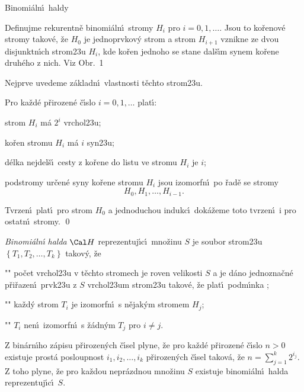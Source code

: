 \heading
Binomi\'aln\'\i\ haldy
\endheading 

\flushpar Definujme rekurentn\v e binomi\'aln\'\i\ stromy $H_i$ pro 
$i=0,1,\dots$.  Jsou to ko\v renov\'e stromy takov\'e, \v ze $H_0$ je 
jednoprvkov\'y strom a  strom $H_{i+1}$ vznikne ze dvou 
disjunktn\'\i ch strom\accent23u $H_i$, kde ko\v ren jednoho  
se stane dal\v s\'\i m synem ko\v rene druh\'eho z nich.  Viz 
Obr.~1 
\medskip

\midinsert
\centerline{}
\endcaption
\endinsert

\flushpar Nejprve uvedeme z\'akladn\'\i\ vlastnosti t\v echto 
strom\accent23u.

Pro ka\v zd\'e p\v rirozen\'e \v c\'\i slo $
i=0,1,\dots$ 
plat\'\i :
\roster
\item
strom $H_i$ m\'a $2^i$ vrchol\accent23u;
\item
ko\v ren stromu $H_i$ m\'a $i$ syn\accent23u;
\item
d\'elka nejdel\v s\'\i\ cesty z ko\v rene do listu ve stromu $H_i$ je 
$i$;
\item
podstromy ur\v cen\'e syny ko\v rene stromu $H_i$ jsou izomorf\-n\'\i\ 
po \v rad\v e se stromy $$H_0,H_1,\dots,H_{i-1}.$$
\endroster
\endproclaim

Tvrzen\'\i\ plat\'\i\ pro strom $H_0$ a 
jednoduchou indukc\'\i\ dok\'a\v zeme toto tvrzen\'\i\  i pro ostatn\'\i\ stromy. \qed
\enddemo


\flushpar\emph{Binomi\'aln\'\i} \emph{halda} $\Cal H$ reprezentuj\'\i c\'\i\ 
mno\v zinu $S$ je soubor strom\accent23u $\left\{T_1,T_2,\dots,T_k\right\}$ 
takov\'y, \v ze 
\roster
\item"{}"
po\v cet vrchol\accent23u v t\v echto stromech je roven 
velikosti $S$ a 
je d\'ano jednozna\v cn\'e p\v ri\v razen\'\i\ prvk\accent23u 
z $S$ vrchol\accent23um strom\accent23u tako\-v\'e, \v ze plat\'\i\ 
podm\'\i nka ;
\item"{}"
ka\v zd\'y strom $T_i$ je izomorfn\'\i\ s n\v ejak\'ym stromem $H_
j$;
\item"{}"
$T_i$ nen\'\i\ izomorfn\'\i\ s \v z\'adn\'ym $T_j$ pro $i\ne j$.
\endroster
\medskip

\flushpar Z bin\'arn\'\i ho z\'apisu p\v rirozen\'ych \v c\'\i sel plyne, \v ze 
pro ka\v zd\'e p\v riro\-ze\-n\'e \v c\'\i slo $n>0$ existuje prost\'a 
posloupnost $i_1,i_2,\dots,i_k$ p\v riro\-ze\-n\'ych \v c\'\i sel takov\'a, \v ze 
$n=\sum_{j=1}^k2^{i_j}$. Z toho plyne, \v ze pro ka\v zdou nepr\'azd\-nou 
mno\v zinu $S$ existuje binomi\'aln\'\i\ halda repre\-zentuj\'\i c\'\i\ $
S$.
\medskip


